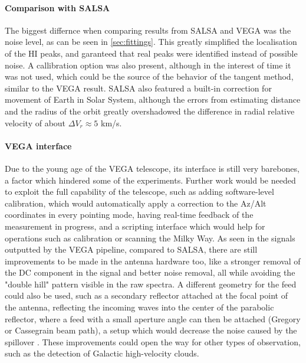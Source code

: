 \paragraph{Comparison with SALSA}
The biggest differnce when comparing results from SALSA and VEGA was the noise level, as can be seen in \autoref{sec:fittings}. This greatly simplified the localisation of the HI peaks, and garanteed that real peaks were identified instead of possible noise. A callibration option was also present, although in the interest of time it was not used, which could be the source of the behavior of the tangent method, similar to the VEGA result. SALSA also featured a built-in correction for movement of Earth in Solar System, although the errors from estimating distance and the radius of the orbit greatly overshadowed the difference in radial relative velocity of about $\Delta V_r \approx 5$ km/s.



\paragraph{VEGA interface}
Due to the young age of the VEGA telescope, its interface is still very barebones, a factor which hindered some of the experiments. Further work would be needed to exploit the full capability of the telescope, such as adding software-level calibration, which would automatically apply a correction to the Az/Alt coordinates in every pointing mode, having real-time feedback of the measurement in progress, and a scripting interface which would help for operations such as calibration or scanning the Milky Way. As seen in the signals outputted by the VEGA pipeline, compared to SALSA, there are still improvements to be made in the antenna hardware too, like a stronger removal of the DC component in the signal and better noise removal, all while avoiding the "double hill" pattern visible in the raw spectra. 
A different geometry for the feed could also be used, such as a secondary reflector attached at the focal point of the antenna, reflecting the incoming waves into the center of the parabolic reflector, where a feed with a small aperture angle can then be attached (Gregory or Cassegrain
beam path), a setup which would decrease the noise caused by the spillover \cite{lauterbach_radio_2022}.
These improvements could open the way for other types of observation, such as the detection of Galactic high-velocity clouds. 


